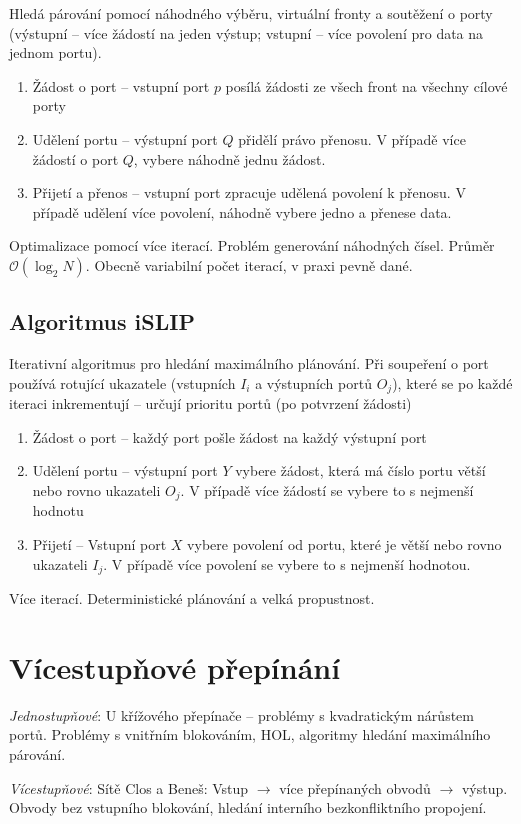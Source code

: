 \documentclass[a4paper, 11pt]{report}
\begin{document}
Hledá párování pomocí náhodného výběru, virtuální fronty a soutěžení o porty (výstupní -- více žádostí na jeden výstup; vstupní -- více povolení pro data na jednom portu).
\begin{enumerate}
	\item Žádost o port -- vstupní port $p$ posílá žádosti ze všech front na všechny cílové porty
	\item Udělení portu -- výstupní port $Q$ přidělí právo přenosu. V případě více žádostí o port $Q$, vybere náhodně jednu žádost.
	\item Přijetí a přenos -- vstupní port zpracuje udělená povolení k přenosu. V případě udělení více povolení, náhodně vybere jedno a přenese data.
\end{enumerate}
Optimalizace pomocí více iterací. Problém generování náhodných čísel. Průměr $\mathcal{O}(\log_2 N)$. Obecně variabilní počet iterací, v praxi pevně dané.

\subsection{Algoritmus iSLIP}
Iterativní algoritmus pro hledání maximálního plánování. Při soupeření o port používá rotující ukazatele (vstupních $I_i$ a výstupních portů $O_j$), které se po každé iteraci inkrementují -- určují prioritu portů (po potvrzení žádosti)
\begin{enumerate}
	\item Žádost o port -- každý port pošle žádost na každý výstupní port
	\item Udělení portu -- výstupní port $Y$ vybere žádost, která má číslo portu větší nebo rovno ukazateli $O_j$. V případě více žádostí se vybere to s nejmenší hodnotu
	\item Přijetí -- Vstupní port $X$ vybere povolení od portu, které je větší nebo rovno ukazateli $I_j$. V případě více povolení se vybere to s nejmenší hodnotou.
\end{enumerate}
Více iterací. Deterministické plánování a velká propustnost.

\section{Vícestupňové přepínání}

\emph{Jednostupňové}: U křížového přepínače -- problémy s kvadratickým nárůstem portů. Problémy s vnitřním blokováním, HOL, algoritmy hledání maximálního párování.

\emph{Vícestupňové}: Sítě Clos a Beneš: Vstup $\rightarrow$ více přepínaných obvodů $\rightarrow$ výstup. Obvody bez vstupního blokování, hledání interního bezkonfliktního propojení.
\end{document}
